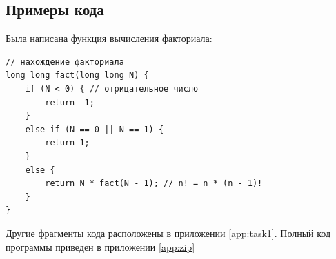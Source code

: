\subsection{Примеры кода}

Была написана функция вычисления факториала:

\begin{verbatim}
// нахождение факториала
long long fact(long long N) {
	if (N < 0) { // отрицательное число 
		return -1;
	}
	else if (N == 0 || N == 1) {
		return 1;
	}
	else {
		return N * fact(N - 1); // n! = n * (n - 1)!
	}
}
\end{verbatim}

Другие фрагменты кода расположены в приложении \ref{app:task1}. Полный код программы приведен в приложении \ref{app:zip}
